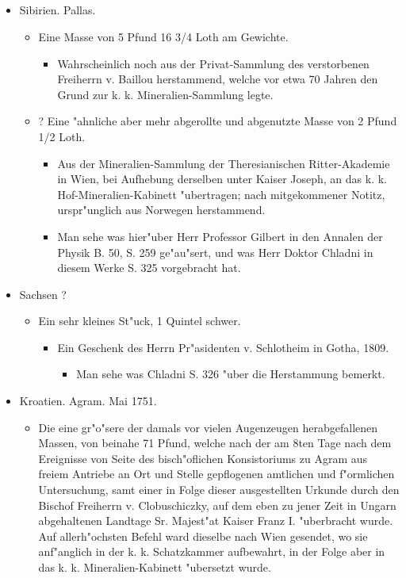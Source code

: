 \documentclass[a4paper, 11pt, oneside, polutonikogreek, german]{article}
\begin{document}
\subsection{}
\begin{itemize}
    \item Sibirien. Pallas.
    \begin{itemize}
        \item Eine Masse von 5 Pfund 16 3/4 Loth am Gewichte.
        \begin{itemize}
            \item Wahrscheinlich noch aus der Privat-Sammlung des verstorbenen Freiherrn v. Baillou herstammend, welche vor etwa 70 Jahren den Grund zur k. k. Mineralien-Sammlung legte.
        \end{itemize}
        \item ? Eine "ahnliche aber mehr abgerollte und abgenutzte Masse von 2 Pfund 1/2 Loth.
        \begin{itemize}
            \item Aus der Mineralien-Sammlung der Theresianischen Ritter-Akademie in Wien, bei Aufhebung derselben unter Kaiser Joseph, an das k. k. Hof-Mineralien-Kabinett "ubertragen; nach mitgekommener Notitz, urspr"unglich aus Norwegen herstammend.
            \item Man sehe was hier"uber Herr Professor Gilbert in den Annalen der Physik B. 50, S. 259 ge"au"sert, und was Herr Doktor Chladni in diesem Werke S. 325 vorgebracht hat.
        \end{itemize}
    \end{itemize}
    \item Sachsen ?
    \begin{itemize}
        \item Ein sehr kleines St"uck, 1 Quintel schwer.
        \begin{itemize}
            \item Ein Geschenk des Herrn Pr"asidenten v. Schlotheim in Gotha, 1809.
            \begin{itemize}
                \item Man sehe was Chladni S. 326 "uber die Herstammung bemerkt.
            \end{itemize}
        \end{itemize}
    \end{itemize}
    \item Kroatien. Agram. Mai 1751.
    \begin{itemize}
        \item Die eine gr"o"sere der damals vor vielen Augenzeugen herabgefallenen Massen, von beinahe 71 Pfund, welche nach der am 8ten Tage nach dem Ereignisse von Seite des bisch"oflichen Konsistoriums zu Agram aus freiem Antriebe an Ort und Stelle gepflogenen amtlichen und f"ormlichen Untersuchung, samt einer in Folge dieser ausgestellten Urkunde durch den Bischof Freiherrn v. Clobuschiczky, auf dem eben zu jener Zeit in Ungarn abgehaltenen Landtage Sr. Majest"at Kaiser Franz I. "uberbracht wurde. Auf allerh"ochsten Befehl ward dieselbe nach Wien gesendet, wo sie anf"anglich in der k. k. Schatzkammer aufbewahrt, in der Folge aber in das k. k. Mineralien-Kabinett "ubersetzt wurde.

\end{itemize}
\end{itemize}
\end{document}
